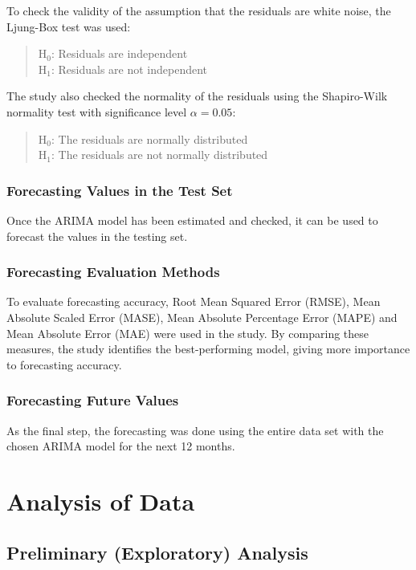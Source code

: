 \documentclass[12pt,a4paper]{report} %
\begin{document}
To check the validity of the assumption that the residuals are white noise, the Ljung-Box test was used:

\begin{quote}
	H$_0$: Residuals are independent \\
	H$_1$: Residuals are not independent
\end{quote}

The study also checked the normality of the residuals using the Shapiro-Wilk normality test with significance level $\alpha = 0.05$:

\begin{quote}
	H$_0$: The residuals are normally distributed \\
	H$_1$: The residuals are not normally distributed
\end{quote}


\subsection{Forecasting Values in the Test Set}
Once the ARIMA model has been estimated and checked, it can be used to forecast the values in the testing set.

\subsection{Forecasting Evaluation Methods}
To evaluate forecasting accuracy, Root Mean Squared Error (RMSE), Mean Absolute Scaled Error (MASE), Mean Absolute Percentage Error (MAPE) and Mean Absolute Error (MAE) were used in the study. By comparing these measures, the study identifies the best-performing model, giving more importance to forecasting accuracy.

\subsection{Forecasting Future Values}
As the final step, the forecasting was done using the entire data set with the chosen ARIMA model for the next 12 months.


\setcounter{chapter}{4} %

	\chapter{Analysis of Data} %
	
	\section{Preliminary (Exploratory) Analysis}
	
\end{document}
